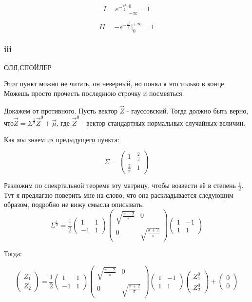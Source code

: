 \documentclass[a4paper,12pt]{article}
\begin{document}
\[ I = e^{-\frac{x^2}{2}}\Biggr|_{-\infty}^{0}   = 1 \]

\[ II = -e^{-\frac{x^2}{2}}\Biggr|_0^{+\infty} = 1  \]



\subsubsection{iii}

ОЛЯ,СПОЙЛЕР

Этот пункт можно не читать, он неверный, но понял я это только в конце. Можешь просто прочесть последнюю строчку и посмеяться.

Докажем от противного. Пусть вектор $ \vec{Z} $ - гауссовский. Тогда  должно быть верно, что$  \vec{Z} = \Sigma^{\frac{1}{2}} \vec{Z}^0 + \vec{\mu} $, где  $ \vec{Z}^0 $  - вектор стандартных нормальных случайных величин.

Как мы знаем из предыдущего пункта:

\[ \Sigma = \begin{pmatrix}
1 & \frac{2}{\pi}\\
\frac{2}{\pi} & 1
\end{pmatrix} \]

Разложим по спекртальной теореме эту матрицу, чтобы возвести её в степень $ \frac{1}{2} $. Тут я предлагаю поверить мне на слово, что она раскладывается следующим образом, подробно не вижу смысла описывать. 
\[ 
\Sigma^{\frac{1}{2}} = \frac{1}{2}\begin{pmatrix}
1 & 1\\
-1 & 1
\end{pmatrix} 
\begin{pmatrix}
\sqrt{\frac{\pi - 2}{\pi}} & 0\\
0 & \sqrt{\frac{\pi + 2}{\pi}}
\end{pmatrix}
\begin{pmatrix}
1 & -1\\
1 & 1
\end{pmatrix} 
\]

Тогда:

\[ \begin{pmatrix}
Z_1\\
Z_2
\end{pmatrix} = \frac{1}{2}\begin{pmatrix}
1 & 1\\
-1 & 1
\end{pmatrix} 
\begin{pmatrix}
\sqrt{\frac{\pi - 2}{\pi}} & 0\\
0 & \sqrt{\frac{\pi + 2}{\pi}}
\end{pmatrix}
\begin{pmatrix}
1 & -1\\
1 & 1
\end{pmatrix}  \begin{pmatrix}
Z_1^0\\
Z_2^0
\end{pmatrix} +    \begin{pmatrix}
0\\
0
\end{pmatrix} \]
\end{document}
